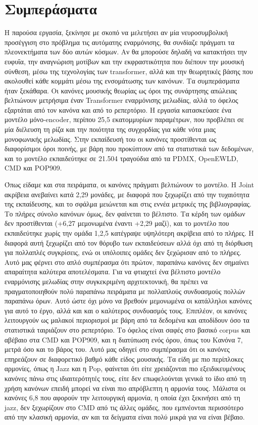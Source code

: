 \section{Συμπεράσματα}
Η παρούσα εργασία, ξεκίνησε με σκοπό να μελετήσει αν μία νευροσυμβολική προσέγγιση στο πρόβλημα τις αυτόματης εναρμόνισης, θα συνδίαζε πράγματι τα πλεονεκτήματα των δύο αυτών κόσμων. Αν θα μπορούσε δηλαδή να κατακτήσει την ευφυΐα, την αναγνώριση μοτίβων και την εκφραστικότητα που διέπουν την μουσική σύνθεση, μέσω της τεχνολογίας των transformer, αλλά και την θεωρητικές βάσης που ακολουθεί κάθε κομμάτι μέσω της ενσομάτωσης των κανόνων. Τα συμπεράσματα ήταν ξεκάθαρα. Οι κανόνες μουσικής θεωρίας ως όροι της συνάρτησης απώλειας βελτιώνουν μετρήσιμα έναν Transformer εναρμόνισης μελωδίας, αλλά το όφελος εξαρτάται από τον κανόνα και από το ρεπερτόριο. Η εργασία κατασκεύασε ένα μοντέλο μόνο-encoder, περίπου 25,5 εκατομμυρίων παραμέτρων, που προβλέπει σε μία διέλευση τη ρίζα και την ποιότητα της συγχορδίας για κάθε νότα μιας μονοφωνικής μελωδίας. Στην εκπαίδευσή του οι κανόνες προστίθενται ως διαφορίσιμοι όροι ποινής, με βάρη που προκύπτουν από τα στατιστικά των δεδομένων, και το μοντέλο εκπαιδεύτηκε σε 21.504 τραγούδια από τα PDMX, OpenEWLD, CMD και POP909.

Όπως είδαμε και στα πειράματα, οι κανόνες πράγματι βελτιώνουν το μοντέλο. Η Joint ακρίβεια ανεβαίνει κατά 2,29 μονάδες, με διαφορά που ξεχωρίζει από την τυχαιότητα της εκπαίδευσης, και το σφάλμα μειώνεται και στις εννέα μετρικές της βιβλιογραφίας. Το πλήρες σύνολο κανόνων όμως, δεν φαίνεται το βέλτιστο. Τα κέρδη των ομάδων δεν προστίθενται (+6,27 μεμονωμένα έναντι +2,29 μαζί), και το μοντέλο που εκπαιδεύτηκε χωρίς την ομάδα {1,2,5} κατέγραψε υψηλότερη ακρίβεια από το πλήρες. Η διαφορά αυτή ξεχωρίζει από τον θόρυβο των εκπαιδεύσεων αλλά όχι από τη διόρθωση για πολλαπλές συγκρίσεις, ενώ οι υπόλοιπες ομάδες δεν ξεχώρισαν από το πλήρες. Αυτό μας φέρνει στο απλό συμπέρασμα ότι πρώτον, παραπάνω κανόνες δεν σημαίνει απαραίτητα καλύτερα αποτελέσματα. Για να φτιαχτεί ένα βέλτιστο μοντέλο εναρμόνισης μελωδίας στην συγκεκριμένη αρχιτεκτονική, θα πρέπει να πραγματοποιηθούν πολύ παραπάνω πειράματα με πολλαπλούς συνδυασμούς πολλών παραπάνω όρων. Αυτό ώστε όχι μόνο να βρεθούν μεμονωμένα οι κατάλληλοι κανόνες για αυτό το έργο, αλλά και και ο καλύτερος συνδυασμός τους. Επιπλέον, οι κανόνες λειτουργούν ως μαλακοί περιορισμοί με βάρη από τα δεδομένα και αποδίδουν όσο τα στατιστικά ταιριάζουν στο ρεπερτόριο. Το όφελος είναι σαφές στο βασικό corpus και αβέβαιο στα CMD και POP909, και η διατύπωση ενός όρου, όπως του Κανόνα 7, μετρά όσο και το βάρος του. Αυτό μας οδηγεί στο συμπέρασμα ότι οι κανόνες επηρεάζουν σε διαφορετικό βαθμό κάθε είδος μουσικής. Τα είδη με πιο περίπλοκες αρμονίες, όπως η Jazz και η Pop, φαίνεται ότι είτε χρειάζονται πιο εξειδικευμένους κανόνες πάνω στις ιδιαιτερότητές τους, είτε δεν επωφελούνται γενικά το ίδιο από τη χρήση κανόνων επειδή μπορεί να είναι πιο απρόβλεπτη η αρμονία τους. Μάλιστα οι κανόνες 6,8 που αφορούν την λειτουργική αρμονία, η οποία έχει ξεκινήσει από τη jazz, δεν ξεχωρίζουν στο CMD από τις άλλες ομάδες, που εμπνέονται περισσότερο από την κλασική αρμονία, αν και τα δείγματα είναι πολύ μικρά για να είναι βέβαιο.

